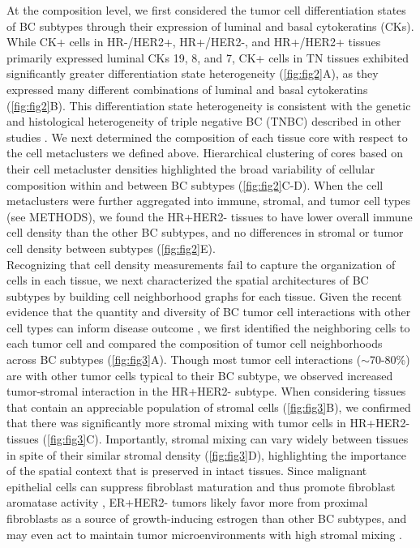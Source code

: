 \documentclass[preprint,review,3p,12pt]{elsarticle}
\begin{document}
At the composition level, we first considered the tumor cell differentiation states of BC subtypes through their expression of luminal and basal cytokeratins (CKs). While CK+ cells in HR-/HER2+, HR+/HER2-, and HR+/HER2+ tissues primarily expressed luminal CKs 19, 8, and 7, CK+ cells in TN tissues exhibited significantly greater differentiation state heterogeneity (\autoref{fig:fig2}A), as they expressed many different combinations of luminal and basal cytokeratins (\autoref{fig:fig2}B). This differentiation state heterogeneity is consistent with the genetic and histological heterogeneity of triple negative BC (TNBC) described in other studies \cite{haupt2010, tnbc2016}. We next determined the composition of each tissue core with respect to the cell metaclusters we defined above. Hierarchical clustering of cores based on their cell metacluster densities highlighted the broad variability of cellular composition within and between BC subtypes (\autoref{fig:fig2}C-D). When the cell metaclusters were further aggregated into immune, stromal, and tumor cell types (see METHODS), we found the HR+HER2- tissues to have lower overall immune cell density than the other BC subtypes, and no differences in stromal or tumor cell density between subtypes (\autoref{fig:fig2}E). \\

Recognizing that cell density measurements fail to capture the organization of cells in each tissue, we next characterized the spatial architectures of BC subtypes by building cell neighborhood graphs for each tissue. Given the recent evidence that the quantity and diversity of BC tumor cell interactions with other cell types can inform disease outcome \cite{keren2018,jackson_single-cell_2020}, we first identified the neighboring cells to each tumor cell and compared the composition of tumor cell neighborhoods across BC subtypes (\autoref{fig:fig3}A). Though most tumor cell interactions ($\sim$70-80\%) are with other tumor cells typical to their BC subtype, we observed increased tumor-stromal interaction in the HR+HER2- subtype. When considering tissues that contain an appreciable population of stromal cells (\autoref{fig:fig3}B), we confirmed that there was significantly more stromal mixing with tumor cells in HR+HER2- tissues (\autoref{fig:fig3}C). Importantly, stromal mixing can vary widely between tissues in spite of their similar stromal density (\autoref{fig:fig3}D), highlighting the importance of the spatial context that is preserved in intact tissues. Since malignant epithelial cells can suppress fibroblast maturation and thus promote fibroblast aromatase activity \cite{bulun2012}, ER+HER2- tumors likely favor more from proximal fibroblasts as a source of growth-inducing estrogen than other BC subtypes, and may even act to maintain tumor microenvironments with high stromal mixing \cite{brechbuhl2017}. \\
\end{document}
